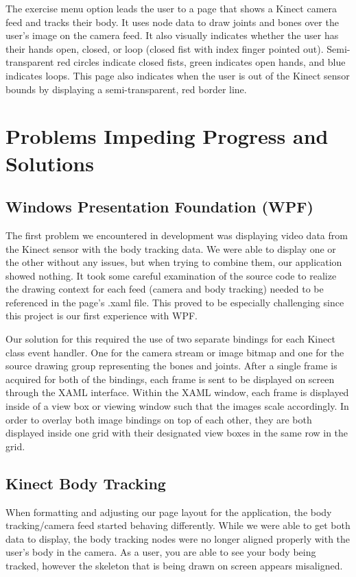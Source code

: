 \documentclass[onecolumn, draftclsnofoot,10pt, compsoc]{IEEEtran}
\begin{document}
The exercise menu option leads the user to a page that shows a Kinect camera feed and tracks their body. It uses node data to draw joints and bones over the user's image on the camera feed. It also visually indicates whether the user has their hands open, closed, or  loop (closed fist with index finger pointed out). Semi-transparent red circles indicate closed fists, green indicates open hands, and blue indicates loops. This page also indicates when the user is out of the Kinect sensor bounds by displaying a semi-transparent, red border line. 

\section{Problems Impeding Progress and Solutions}
\subsection{Windows Presentation Foundation (WPF)}
The first problem we encountered in development was displaying video data from the Kinect sensor with the body tracking data. We were able to display one or the other without any issues, but when trying to combine them, our application showed nothing. It took some careful examination of the source code to realize the drawing context for each feed (camera and body tracking) needed to be referenced in the page's .xaml file. This proved to be especially challenging since this project is our first experience with WPF.

Our solution for this required the use of two separate bindings for each Kinect class event handler. One for the camera stream or image bitmap and one for the source drawing group representing the bones and joints. After a single frame is acquired for both of the bindings, each frame is sent to be displayed on screen through the XAML interface. Within the XAML window, each frame is displayed inside of a view box or viewing window such that the images scale accordingly. In order to overlay both image bindings on top of each other, they are both displayed inside one grid with their designated view boxes in the same row in the grid.

\subsection{Kinect Body Tracking}
When formatting and adjusting our page layout for the application, the body tracking/camera feed started behaving differently. While we were able to get both data to display, the body tracking nodes were no longer aligned properly with the user's body in the camera. As a user, you are able to see your body being tracked, however the skeleton that is being drawn on screen appears misaligned. 
\end{document}
